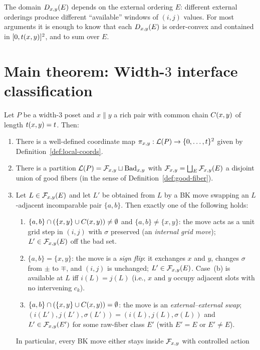 \begin{remark}
The domain $D_{x,y}(E)$ depends on the external ordering $E$: different external
orderings produce different ``available'' windows of $(i,j)$ values.
For most arguments it is enough to know that each $D_{x,y}(E)$ is order-convex
and contained in $[0,t(x,y)]^2$, and to sum over $E$.
\end{remark}

\section{Main theorem: Width-$3$ interface classification}

\begin{theorem}\label{thm:interface}
Let $P$ be a width-$3$ poset and $x\parallel y$ a rich pair with common chain
$C(x,y)$ of length $t(x,y)=t$. Then:
\begin{enumerate}[label=(\roman*),nosep]
\item\label{part:coords}
There is a well-defined coordinate map $\pi_{x,y}:\mathcal{L}(P)\to\{0,\dots,t\}^2$ given by
Definition~\ref{def:local-coords}.
\item\label{part:goodfiber}
There is a partition $\mathcal{L}(P)=\mathcal{F}_{x,y}\sqcup \mathrm{Bad}_{x,y}$ with
$\mathcal{F}_{x,y}=\bigsqcup_{E}\mathcal{F}_{x,y}(E)$ a disjoint union of good fibers (in the sense of
Definition~\ref{def:good-fiber}).
\item\label{part:moves}
Let $L\in\mathcal{F}_{x,y}(E)$ and let $L'$ be obtained from $L$ by a BK move swapping an
$L$-adjacent incomparable pair $\{a,b\}$. Then exactly one of the following
holds:
\begin{enumerate}[label=(\alph*),nosep]
\item $\{a,b\}\cap(\{x,y\}\cup C(x,y))\ne\emptyset$ and $\{a,b\}\ne\{x,y\}$: the
move acts as a unit grid step in $(i,j)$ with $\sigma$ preserved (an
\emph{internal grid move}); $L'\in\mathcal{F}_{x,y}(E)$ off the bad set.
\item $\{a,b\}=\{x,y\}$: the move is a \emph{sign flip}: it exchanges $x$ and
$y$, changes $\sigma$ from $\pm$ to $\mp$, and $(i,j)$ is unchanged;
$L'\in\mathcal{F}_{x,y}(E)$. Case~(b) is available at $L$ iff $i(L)=j(L)$ (i.e., $x$ and
$y$ occupy adjacent slots with no intervening $c_k$).
\item $\{a,b\}\cap(\{x,y\}\cup C(x,y))=\emptyset$: the move is an
\emph{external--external swap}; $(i(L'),j(L'),\sigma(L'))=(i(L),j(L),\sigma(L))$
and $L'\in\mathcal{F}_{x,y}(E')$ for some raw-fiber class $E'$ (with $E'=E$ or $E'\ne E$).
\end{enumerate}
In particular, every BK move either stays inside $\mathcal{F}_{x,y}$ with controlled action

\end{enumerate}
\end{theorem}
